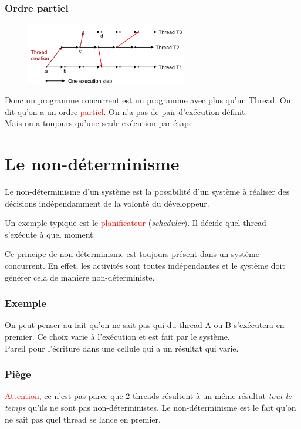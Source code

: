 \documentclass{report}
\begin{document}
\subsubsection{Ordre partiel}
\begin{figure}
\centering
\includegraphics[width=7cm]{img/ordrePartiel.png}
\end{figure}
Donc un programme concurrent est un programme avec plus qu'un Thread. On dit qu'on a un ordre \textcolor{red}{partiel}. On n'a pas de pair d'exécution définit.\\
Mais on a toujours qu'une seule exécution par étape

\section{Le non-déterminisme}
Le non-déterminisme d'un système est la possibilité d'un système à réaliser des décisions indépendamment de la volonté du développeur.\par
Un exemple typique est le \textcolor{red}{planificateur} (\textit{scheduler}). Il décide quel thread s'exécute à quel moment.\par
Ce principe de non-déterminisme est toujours présent dans un système concurrent. En effet, les activités sont toutes indépendantes et le système doit générer cela de manière non-déterministe.
\subsubsection{Exemple}
On peut penser au fait qu'on ne sait pas qui du thread A ou B s'exécutera en premier. Ce choix varie à l'exécution et est fait par le système.\\
Pareil pour l'écriture dans une cellule qui a un résultat qui varie.\par

\subsubsection{Piège}
\textcolor{red}{Attention}, ce n'est pas parce que 2 threads résultent à un même résultat \textit{tout le temps} qu'ils ne sont pas non-déterministes. Le non-déterminisme est le fait qu'on ne sait pas quel thread se lance en premier.
\end{document}
